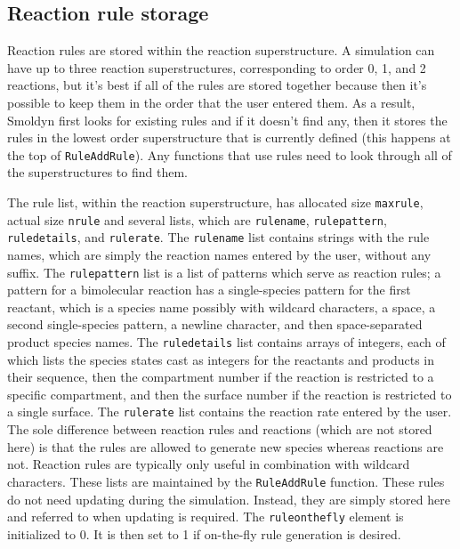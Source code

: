 \documentclass {book}
\begin{document}
\subsection*{Reaction rule storage}

Reaction rules are stored within the reaction superstructure. A simulation can have up to three reaction superstructures, corresponding to order 0, 1, and 2 reactions, but it's best if all of the rules are stored together because then it's possible to keep them in the order that the user entered them. As a result, Smoldyn first looks for existing rules and if it doesn't find any, then it stores the rules in the lowest order superstructure that is currently defined (this happens at the top of \texttt{RuleAddRule}). Any functions that use rules need to look through all of the superstructures to find them.

The rule list, within the reaction superstructure, has allocated size \texttt{maxrule}, actual size \texttt{nrule} and several lists, which are \texttt{rulename}, \texttt{rulepattern}, \texttt{ruledetails}, and \texttt{rulerate}. The \texttt{rulename} list contains strings with the rule names, which are simply the reaction names entered by the user, without any suffix. The \texttt{rulepattern} list is a list of patterns which serve as reaction rules; a pattern for a bimolecular reaction has a single-species pattern for the first reactant, which is a species name possibly with wildcard characters, a space, a second single-species pattern, a newline character, and then space-separated product species names. The \texttt{ruledetails} list contains arrays of integers, each of which lists the species states cast as integers for the reactants and products in their sequence, then the compartment number if the reaction is restricted to a specific compartment, and then the surface number if the reaction is restricted to a single surface. The \texttt{rulerate} list contains the reaction rate entered by the user. The sole difference between reaction rules and reactions (which are not stored here) is that the rules are allowed to generate new species whereas reactions are not. Reaction rules are typically only useful in combination with wildcard characters. These lists are maintained by the \texttt{RuleAddRule} function. These rules do not need updating during the simulation. Instead, they are simply stored here and referred to when updating is required. The \texttt{ruleonthefly} element is initialized to 0. It is then set to 1 if on-the-fly rule generation is desired.
\end{document}
